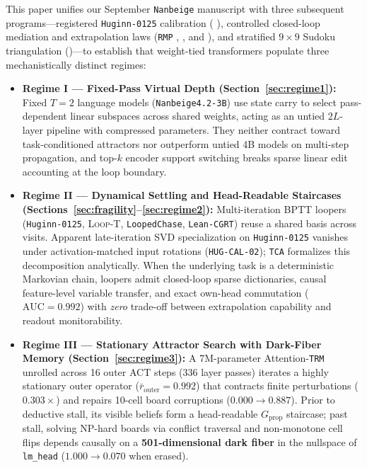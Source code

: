 \documentclass[10pt,letterpaper]{article}
\newcommand{\LoopT}{\textsc{Loop-T}}
\newcommand{\Gprop}{G_{\mathrm{prop}}}
\begin{document}
This paper unifies our September \texttt{Nanbeige} manuscript \cite{dugan2026vpd} with three subsequent programs—registered \texttt{Huginn-0125} calibration ( \cite{dugan2026hugcal}), controlled closed-loop mediation and extrapolation laws (\texttt{RMP} \cite{dugan2026rmp}, , and  \cite{dugan2026arg02}), and stratified $9\times 9$ Sudoku triangulation ()—to establish that weight-tied transformers populate three mechanistically distinct regimes:
\begin{itemize}
  \item \textbf{Regime I — Fixed-Pass Virtual Depth (Section~\ref{sec:regime1}):} Fixed $T=2$ language models (\texttt{Nanbeige4.2-3B}) use state carry to select pass-dependent linear subspaces across shared weights, acting as an untied $2L$-layer pipeline with compressed parameters. They neither contract toward task-conditioned attractors nor outperform untied 4B models on multi-step propagation, and top-$k$ encoder support switching breaks sparse linear edit accounting at the loop boundary.
  \item \textbf{Regime II — Dynamical Settling and Head-Readable Staircases (Sections~\ref{sec:fragility}--\ref{sec:regime2}):} Multi-iteration BPTT loopers (\texttt{Huginn-0125}, \LoopT, \texttt{LoopedChase}, \texttt{Lean-CGRT}) reuse a shared basis across visits. Apparent late-iteration SVD specialization on \texttt{Huginn-0125} vanishes under activation-matched input rotations (\texttt{HUG-CAL-02}); \texttt{TCA} formalizes this decomposition analytically. When the underlying task is a deterministic Markovian chain, loopers admit closed-loop sparse dictionaries, causal feature-level variable transfer, and exact own-head commutation ($\mathrm{AUC}=0.992$) with \emph{zero} trade-off between extrapolation capability and readout monitorability.
  \item \textbf{Regime III — Stationary Attractor Search with Dark-Fiber Memory (Section~\ref{sec:regime3}):} A 7M-parameter Attention-\texttt{TRM} unrolled across 16 outer ACT steps (336 layer passes) iterates a highly stationary outer operator ($\bar{r}_{\mathrm{outer}}=0.992$) that contracts finite perturbations ($0.303\times$) and repairs 10-cell board corruptions ($0.000 \to 0.887$). Prior to deductive stall, its visible beliefs form a head-readable $\Gprop$ staircase; past stall, solving NP-hard boards via conflict traversal and non-monotone cell flips depends causally on a \textbf{501-dimensional dark fiber} in the nullspace of \texttt{lm\_head} ($1.000 \to 0.070$ when erased).
\end{itemize}
\end{document}
